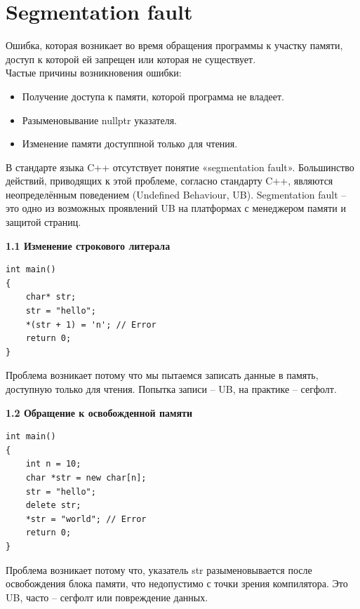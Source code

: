 \documentclass[14pt]{extreport}
\begin{document}

\newpage
{\centering\section{Segmentation fault}}
Ошибка, которая возникает во время обращения программы к участку памяти, доступ к которой ей запрещен или которая не существует. \\
Частые причины возникновения ошибки:
\begin{itemize}
    \item Получение доступа к памяти, которой программа не владеет.
    \item Разыменовывание nullptr указателя.
    \item Изменение памяти доступпной только для чтения.
\end{itemize}

В стандарте языка C++ отсутствует понятие «segmentation fault». Большинство действий, приводящих к этой проблеме, согласно стандарту C++, являются неопределённым поведением (Undefined Behaviour, UB). Segmentation fault -- это одно из возможных проявлений UB на платформах с менеджером памяти и защитой страниц.

\hspace{0.5cm}

\centerline{\large{\textbf{1.1 Изменение строкового литерала}}}

\begin{verbatim}
int main()
{
    char* str;
    str = "hello";
    *(str + 1) = 'n'; // Error
    return 0;
}
\end{verbatim}

Проблема возникает потому что мы пытаемся записать данные в память, доступную только для чтения. Попытка записи -- UB, на практике -- сегфолт.

\hspace{0.5cm}

\centerline{\large{\textbf{1.2 Обращение к освобожденной памяти}}}
\begin{verbatim}
int main()
{
    int n = 10;
    char *str = new char[n];
    str = "hello";
    delete str;
    *str = "world"; // Error
    return 0;
}
\end{verbatim}
Проблема возникает потому что, указатель str разыменовывается после освобождения блока памяти, что недопустимо с точки зрения компилятора. Это UB, часто -- сегфолт или повреждение данных.
\end{document}
